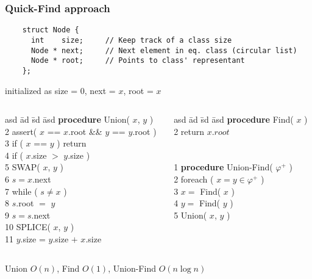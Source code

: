 \begin{frame}[fragile]
  \frametitle{Quick-Find approach}

  \scriptsize

  \begin{verbatim}
    struct Node { 
      int    size;     // Keep track of a class size
      Node * next;     // Next element in eq. class (circular list)
      Node * root;     // Points to class' representant
    };
  \end{verbatim} 
  initialized as size = 0, next = $x$, root = $x$
  \vfill
  \begin{columns}

  \begin{column}{.45\textwidth}
    \pause
    \begin{tabbing}
      asd \= ad \= sd \= asd  \> {\bf procedure} Union( $x$, $y$ ) \\
      2 \> assert( $x$ == $x$.root \&\& $y$ == $y$.root ) \\
      3 \> if ( $x$ == $y$ ) return \\
      4 \> if ( $x$.size $>$ $y$.size ) \\
      5 \> \> SWAP( $x$, $y$ ) \\
      6 \> $s = x$.next \\
      7 \> while ( $s \not= x$ ) \\
      8 \> \> $s$.root $=$ $y$ \\
      9 \> \> $s = s$.next \\
     10 \> SPLICE( $x$, $y$ ) \\
     11 \> $y$.size = $y$.size $+$ $x$.size \\
    \end{tabbing}
  \end{column}
  
  \begin{column}{.35\textwidth}
    \begin{tabbing}
      asd \= ad \= sd \= asd  \> {\bf procedure} Find( $x$ ) \\
      2 \> return $x.root$ \\
      \\
      \\
      1 \> {\bf procedure} Union-Find( $\varphi^+$ ) \\
      2 \> foreach ( $x=y \in \varphi^+$ ) \\  
      3 \> \> $x =$ Find( $x$ ) \\
      4 \> \> $y =$ Find( $y$ ) \\
      5 \> \> Union( $x$, $y$ )
    \end{tabbing}
  \end{column}

  \end{columns}
  \vfill\pause
  Union $O(n)$, Find $O(1)$, Union-Find $O(n\log n)$

\end{frame}
